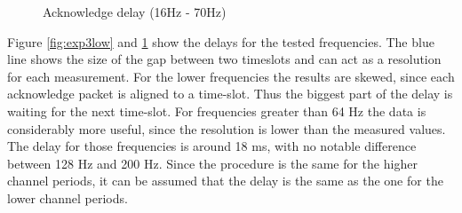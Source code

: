 \begin{description}
\begin{figure}[H]
		\caption{Acknowledge delay (16Hz - 70Hz)}\label{fig:exp3high}
	\end{figure}
	Figure \ref{fig:exp3low} and \ref{fig:exp3high} show the delays for the tested frequencies. The blue line shows the size of the gap between two timeslots and can act as a resolution for each measurement. For the lower frequencies the results are skewed, since each acknowledge packet is aligned to a time-slot. Thus the biggest part of the delay is waiting for the next time-slot. For frequencies greater than 64 Hz the data is considerably more useful, since the resolution is lower than the measured values. The delay for those frequencies is around 18 ms, with no notable difference between 128 Hz and 200 Hz. Since the procedure is the same for the higher channel periods, it can be assumed that the delay is the same as the one for the lower channel periods.
\end{description}
\newpage


